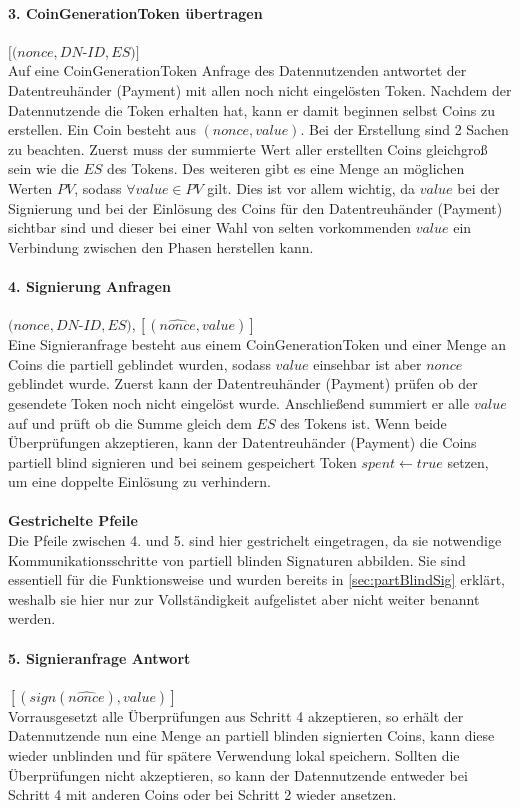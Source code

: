 \documentclass[11pt,a4paper]{scrreprt}
\begin{document}
\paragraph{3. CoinGenerationToken übertragen} $[(nonce, DN$-$ID, ES)]$\\
Auf eine CoinGenerationToken Anfrage des Datennutzenden antwortet der Datentreuhänder (Payment) mit allen noch nicht eingelösten Token. Nachdem der Datennutzende die Token erhalten hat, kann er damit beginnen selbst Coins zu erstellen. Ein Coin besteht aus $(nonce, value)$. Bei der Erstellung sind 2 Sachen zu beachten. Zuerst muss der summierte Wert aller erstellten Coins gleichgroß sein wie die $ES$ des Tokens. Des weiteren gibt es eine Menge an möglichen Werten $PV$, sodass $\forall value\in  PV$ gilt. Dies ist vor allem wichtig, da $value$ bei der Signierung und bei der Einlösung des Coins für den Datentreuhänder (Payment) sichtbar sind und dieser bei einer Wahl von selten vorkommenden $value$ ein Verbindung zwischen den Phasen herstellen kann.

\paragraph{4. Signierung Anfragen} $(nonce, DN$-$ID, ES), [(\widehat{nonce},value)]$\\
Eine Signieranfrage besteht aus einem CoinGenerationToken und einer Menge an Coins die partiell geblindet wurden, sodass $value$ einsehbar ist aber $nonce$ geblindet wurde. Zuerst kann der Datentreuhänder (Payment) prüfen ob der gesendete Token noch nicht eingelöst wurde. Anschließend summiert er alle $value$ auf und prüft ob die Summe gleich dem $ES$ des Tokens ist. Wenn beide Überprüfungen akzeptieren, kann der Datentreuhänder (Payment) die Coins partiell blind signieren und bei seinem gespeichert Token $spent \leftarrow true$ setzen, um eine doppelte Einlösung zu verhindern.
\\\\
\textbf{Gestrichelte Pfeile}\\
Die Pfeile zwischen 4. und 5. sind hier gestrichelt eingetragen, da sie notwendige Kommunikationsschritte von partiell blinden Signaturen abbilden. Sie sind essentiell für die Funktionsweise und wurden bereits in \ref{sec:partBlindSig} erklärt, weshalb sie hier nur zur Vollständigkeit aufgelistet aber nicht weiter benannt werden.

\paragraph{5. Signieranfrage Antwort} $[(sign(\widehat{nonce}),value)]$ \\
Vorrausgesetzt alle Überprüfungen aus Schritt 4 akzeptieren, so erhält der Datennutzende nun eine Menge an partiell blinden signierten Coins, kann diese wieder unblinden und für spätere Verwendung lokal speichern. Sollten die Überprüfungen nicht akzeptieren, so kann der Datennutzende entweder bei Schritt 4 mit anderen Coins oder bei Schritt 2 wieder ansetzen.\\\\
\end{document}
